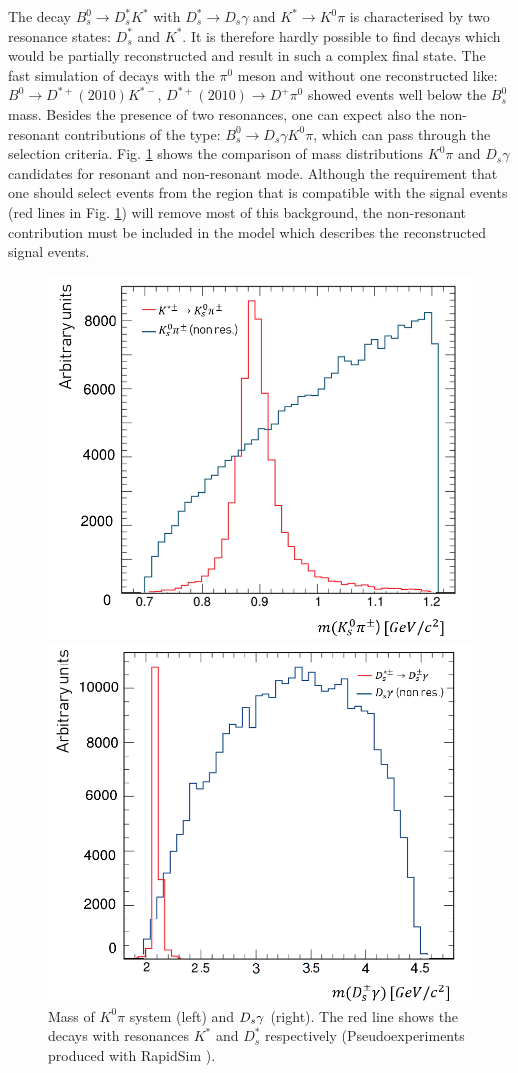 \documentclass{appolb}
\begin{document}
The decay $B^0_s \rightarrow D_s^* K^*$ with $D_s^*\rightarrow D_s \gamma$ and $K^*\rightarrow K^0 \pi$ is characterised by two resonance states: $D_s^*$ and $K^*$. It is therefore hardly possible to find  decays which would be partially reconstructed and result in such a complex final state. The fast simulation of decays with the $\pi^0$ meson and without one \g reconstructed like: $B^0 \rightarrow D^{*+}(2010) K^{*-}$, $D^{*+}(2010)\rightarrow D^+ \pi^0$ showed events well below the $B^0_s$ mass. Besides the presence of two resonances, one can expect also the non-resonant contributions of the type: $B^0_s \rightarrow D_s \gamma  K^0 \pi$,  which can pass through the selection criteria.  Fig. \ref{Fig:F2} shows the comparison of mass distributions $K^0 \pi$ and $D_s \gamma$ candidates for resonant and non-resonant mode. Although the requirement that one should select events from the region that is compatible with the signal events (red lines in Fig. \ref{Fig:F2}) will remove most of this background, the non-resonant contribution must be included in the model which describes the reconstructed signal events.
\begin{figure}[htbp]
\centering
\begin{minipage}{0.5\textwidth}
  \centering
\includegraphics[width=6.4 cm]{Kstar.png}
\end{minipage}%
\begin{minipage}{0.5\textwidth}
  \centering
\includegraphics[width= 6.4 cm]{Dstar.png}
\end{minipage}%
\caption{Mass  of $K^0 \pi$ system (left) and $D_s {\gamma}$ (right).
The red line shows the decays with resonances $K^*$ and $D_s^*$ respectively (Pseudoexperiments produced with RapidSim \cite{rapidsim}).} 
\label{Fig:F2}
\end{figure}
\end{document}
